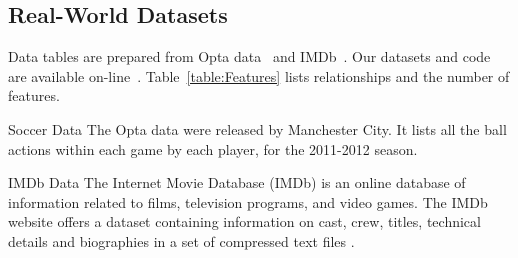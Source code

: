 \documentclass[conference]{IEEEtran}
\begin{document}
				\subsection{Real-World Datasets} \label{sec:real-world-data}
				Data tables are prepared from Opta data~\cite{opta-original} and IMDb~\cite{IMDb-original}. Our datasets and code are available on-line~\cite{bib:jbnsite}. Table~\ref{table:Features} lists relationships and the number of features. 
				\begin{table}[htbp]
							\caption{Relationships and Features in Real-World Datasets.
								\label{table:Features}}
					\centering
				
					\end{table}
					\begin{LaTeXdescription}
						\item[Soccer Data]
						The Opta data were released by Manchester City. 
						It lists all the ball actions within each game by each player, for the 2011-2012 season.
						\item[IMDb Data]
						The Internet Movie Database (IMDb) is an online database of information related to films, television programs, and video games.
						The IMDb website offers a dataset containing information on cast, crew, titles, technical details and biographies in a set of compressed text files \cite{Peralta2007}.
					\end{LaTeXdescription}
					
\end{document}
